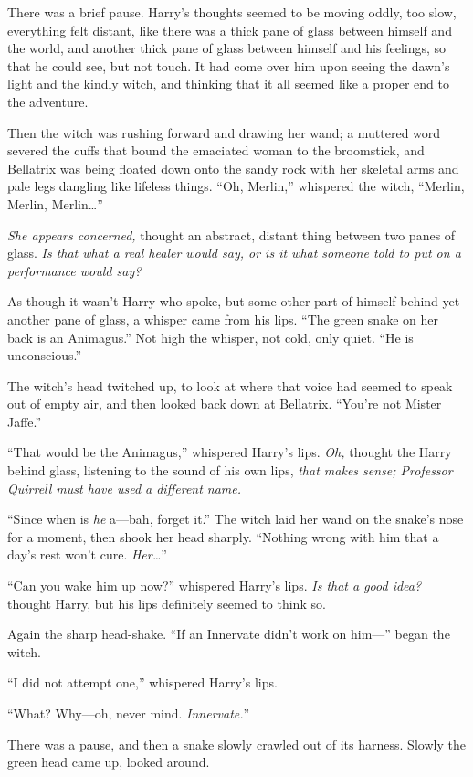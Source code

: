 There was a brief pause. Harry’s thoughts seemed to be moving oddly, too slow, everything felt distant, like there was a thick pane of glass between himself and the world, and another thick pane of glass between himself and his feelings, so that he could see, but not touch. It had come over him upon seeing the dawn’s light and the kindly witch, and thinking that it all seemed like a proper end to the adventure.

Then the witch was rushing forward and drawing her wand; a muttered word severed the cuffs that bound the emaciated woman to the broomstick, and Bellatrix was being floated down onto the sandy rock with her skeletal arms and pale legs dangling like lifeless things. “Oh, Merlin,” whispered the witch, “Merlin, Merlin, Merlin…”

\emph{She appears concerned,} thought an abstract, distant thing between two panes of glass. \emph{Is that what a real healer would say, or is it what someone told to put on a performance would say?}

As though it wasn’t Harry who spoke, but some other part of himself behind yet another pane of glass, a whisper came from his lips. “The green snake on her back is an Animagus.” Not high the whisper, not cold, only quiet. “He is unconscious.”

The witch’s head twitched up, to look at where that voice had seemed to speak out of empty air, and then looked back down at Bellatrix. “You’re not Mister Jaffe.”

“That would be the Animagus,” whispered Harry’s lips. \emph{Oh,} thought the Harry behind glass, listening to the sound of his own lips, \emph{that makes sense; Professor Quirrell must have used a different name.}

“Since when is \emph{he} a—bah, forget it.” The witch laid her wand on the snake’s nose for a moment, then shook her head sharply. “Nothing wrong with him that a day’s rest won’t cure. \emph{Her…}”

“Can you wake him up now?” whispered Harry’s lips. \emph{Is that a good idea?} thought Harry, but his lips definitely seemed to think so.

Again the sharp head-shake. “If an Innervate didn’t work on him—” began the witch.

“I did not attempt one,” whispered Harry’s lips.

“What? Why—oh, never mind. \emph{Innervate.}”

There was a pause, and then a snake slowly crawled out of its harness. Slowly the green head came up, looked around.

